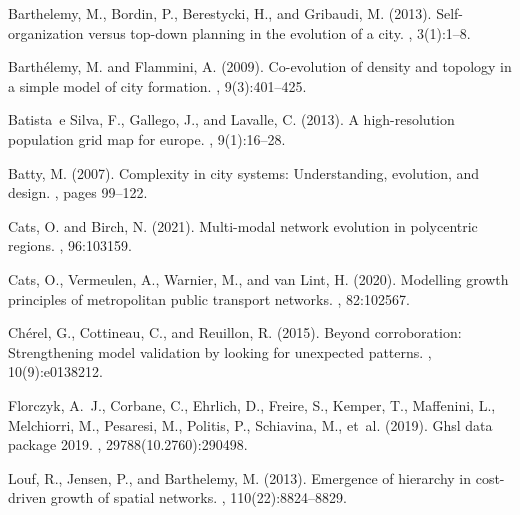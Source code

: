 \documentclass{article}
\begin{document}
\begin{thebibliography}{}

Barthelemy, M., Bordin, P., Berestycki, H., and Gribaudi, M. (2013).
\newblock Self-organization versus top-down planning in the evolution of a
  city.
, 3(1):1--8.

Barth{\'e}lemy, M. and Flammini, A. (2009).
\newblock Co-evolution of density and topology in a simple model of city
  formation.
, 9(3):401--425.

Batista~e Silva, F., Gallego, J., and Lavalle, C. (2013).
\newblock A high-resolution population grid map for europe.
, 9(1):16--28.

Batty, M. (2007).
\newblock Complexity in city systems: Understanding, evolution, and design.
, pages 99--122.

Cats, O. and Birch, N. (2021).
\newblock Multi-modal network evolution in polycentric regions.
, 96:103159.

Cats, O., Vermeulen, A., Warnier, M., and van Lint, H. (2020).
\newblock Modelling growth principles of metropolitan public transport
  networks.
, 82:102567.

Ch{\'e}rel, G., Cottineau, C., and Reuillon, R. (2015).
\newblock Beyond corroboration: Strengthening model validation by looking for
  unexpected patterns.
, 10(9):e0138212.

Florczyk, A.~J., Corbane, C., Ehrlich, D., Freire, S., Kemper, T., Maffenini,
  L., Melchiorri, M., Pesaresi, M., Politis, P., Schiavina, M., et~al. (2019).
\newblock Ghsl data package 2019.
, 29788(10.2760):290498.

Louf, R., Jensen, P., and Barthelemy, M. (2013).
\newblock Emergence of hierarchy in cost-driven growth of spatial networks.
,
  110(22):8824--8829.


\end{thebibliography}
\end{document}
